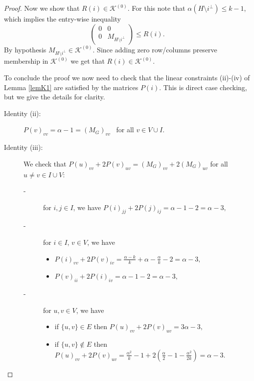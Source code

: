 \documentclass[11pt]{article}
\numberwithin{equation}{section}
\newcommand{\MK}{{\mathcal K}}
\begin{document}
\begin{proof}
Now we show that $R(i)\in \MK^{(0)}$. For this note that $\alpha(H\setminus i^\perp)\leq k-1$, which implies the entry-wise inequality 
$$\left(
\begin{array}{c|c}
0 & 0\\
\hline
0 & M_{H\setminus i^{\perp}}
\end{array}
\right) \leq R(i).$$
By hypothesis $M_{H\setminus i^\perp}\in\MK^{(0)}$. Since adding zero row/columns preserve membership  in $\MK^{(0)}$ we get that $R(i)\in \MK^{(0)}$.

To conclude the proof we now need  to check that the linear constraints (ii)-(iv) of Lemma \ref{lemK1} are satisfied by the matrices $P(i)$. This is direct case checking, but we give the details for clarity.
\begin{description}
\item [Identity (ii):] $P(v)_{vv}=\alpha-1=(M_G)_{vv}$ \ for all $v\in V\cup I$.
	\item [Identity (iii):] We check that $P(u)_{vv}+2P(v)_{uv} = (M_G)_{vv}+2(M_G)_{uv}$ for all $u \ne v\in I\cup V$:   
	\begin{description}
		\item [-] for $i,j\in I$, we have   $P(i)_{jj}+2P(j)_{ij}=\alpha-1-2=\alpha-3,$
		\item [-] for $i\in I$, $v\in V$, we have 
			\begin{itemize}
				\item $P(i)_{vv}+2P(v)_{iv}=\frac{\alpha-k}{k}+\alpha-\frac{\alpha}{k}-2=\alpha-3,$
				\item $P(v)_{ii}+2P(i)_{iv}=\alpha-1-2=\alpha-3,$
			\end{itemize}
			
		\item  [-] for $u,v\in V$, we have
			\begin{itemize}
				\item if $\{u,v\}\in E$ then $P(u)_{vv}+2P(v)_{uv}=3\alpha-3,$
				\item if  $\{u,v\} \notin E$ then  $P(u)_{vv}+2P(v)_{uv}=\frac{\alpha^2}{k}-1+2(\frac{\alpha}{2}-1-\frac{\alpha^2}{2k})=\alpha-3.$
			\end{itemize}	
		\end{description}



\end{description}
\end{proof}
\end{document}
